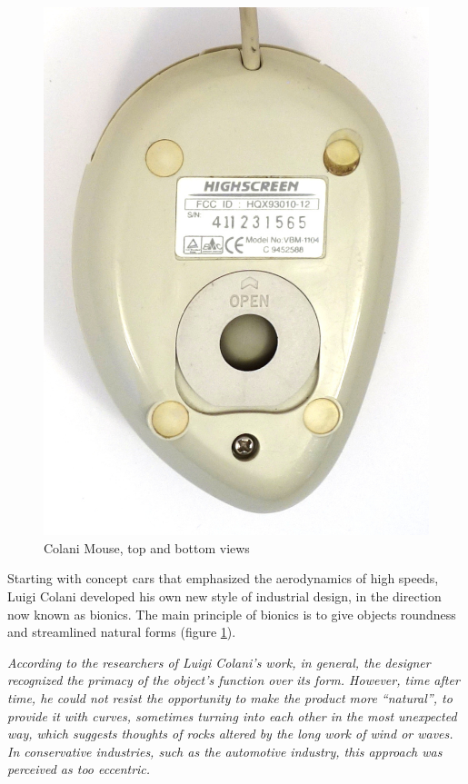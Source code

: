 \documentclass[11pt, a4paper]{article}
\begin{document}
\begin{figure}[h]
    \includegraphics[scale=0.5]{1993_colani_mouse/bottom_30.jpg}
    \caption{Colani Mouse, top and bottom views}
    \label{fig:ColaniMouseTopBottom}
\end{figure}

Starting with concept cars that emphasized the aerodynamics of high speeds, Luigi Colani developed his own new style of industrial design, in the direction now known as bionics. The main principle of bionics is to give objects roundness and streamlined natural forms (figure \ref{fig:ColaniMouseTopBottom}).

\textit{According to the researchers of Luigi Colani's work, in general, the designer recognized the primacy of the object's function over its form. However, time after time, he could not resist the opportunity to make the product more “natural”, to provide it with curves, sometimes turning into each other in the most unexpected way, which suggests thoughts of rocks altered by the long work of wind or waves. In conservative industries, such as the automotive industry, this approach was perceived as too eccentric.}
\end{document}
